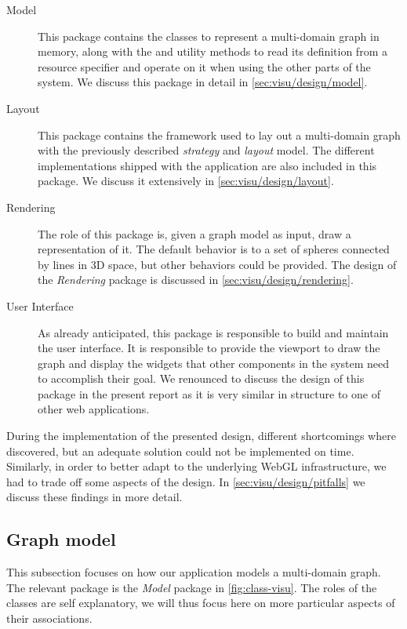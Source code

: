 \begin{description}
  \item[Model] This package contains the classes to represent a multi-domain graph in memory, along with the and utility methods to read its definition from a resource specifier and operate on it when using the other parts of the system. We discuss this package in detail in \vref{sec:visu/design/model}.
  \item[Layout] This package contains the framework used to lay out a multi-domain graph with the previously described \emph{strategy} and \emph{layout} model. The different implementations shipped with the application are also included in this package. We discuss it extensively in \vref{sec:visu/design/layout}.
  \item[Rendering] The role of this package is, given a graph model as input, draw a representation of it. The default behavior is to a set of spheres connected by lines in 3D space, but other behaviors could be provided. The design of the \emph{Rendering} package is discussed in \vref{sec:visu/design/rendering}.
  \item[User Interface] As already anticipated, this package is responsible to build and maintain the user interface. It is responsible to provide the viewport to draw the graph and display the widgets that other components in the system need to accomplish their goal. We renounced to discuss the design of this package in the present report as it is very similar in structure to one of other web applications.
\end{description}

During the implementation of the presented design, different shortcomings where discovered, but an adequate solution could not be implemented on time. Similarly, in order to better adapt to the underlying WebGL infrastructure, we had to trade off some aspects of the design. In \vref{sec:visu/design/pitfalls} we discuss these findings in more detail.

\subsection{Graph model}
\label{sec:visu/design/model}

This subsection focuses on how our application models a multi-domain graph. The relevant package is the \emph{Model} package in \vref{fig:class-visu}. The roles of the classes are self explanatory, we will thus focus here on more particular aspects of their associations.


